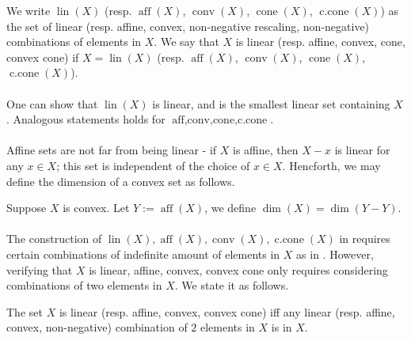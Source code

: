 \begin{defn}\label{defn:011-hull}
	We write $\operatorname{lin}(X)$ (resp. $\operatorname{aff}(X)$, $\operatorname{conv}(X)$, $\operatorname{cone}(X)$, $\operatorname{c.cone}(X)$) as the set of linear (resp. affine, convex, non-negative rescaling, non-negative) combinations of elements in $X$. We say that $X$ is linear (resp. affine, convex, cone, convex cone) if $X=\operatorname{lin}(X)$ (resp. $\operatorname{aff}(X)$, $\operatorname{conv}(X)$, $\operatorname{cone}(X)$, $\operatorname{c.cone}(X)$).
\end{defn}

\paragraph{}One can show that $\operatorname{lin}(X)$ is linear, and is the smallest linear set containing $X$. Analogous statements holds for $\operatorname{aff,conv,cone,c.cone}$.

\paragraph{}Affine sets are not far from being linear - if $X$ is affine, then $X-x$ is linear for any $x\in X$; this set is independent of the choice of $x\in X$. Hencforth, we may define the dimension of a convex set as follows.

\begin{defn}[Dimension]\label{defn:011-dim}
	Suppose $X$ is convex. Let $Y:=\operatorname{aff}(X)$, we define $\dim(X)=\operatorname{dim}(Y-Y)$.
\end{defn}

\paragraph{}The construction of $\operatorname{lin}(X),\operatorname{aff}(X),\operatorname{conv}(X),\operatorname{c.cone}(X)$ in  requires certain combinations of indefinite amount of elements in $X$ as in . However, verifying that $X$ is linear, affine, convex, convex cone only requires considering combinations of two elements in $X$. We state it as follows.

\begin{prop}\label{prop:011-bi}
	The set $X$ is linear (resp. affine, convex, convex cone) iff any linear (resp. affine, convex, non-negative) combination of $2$ elements in $X$ is in $X$.
\end{prop}

